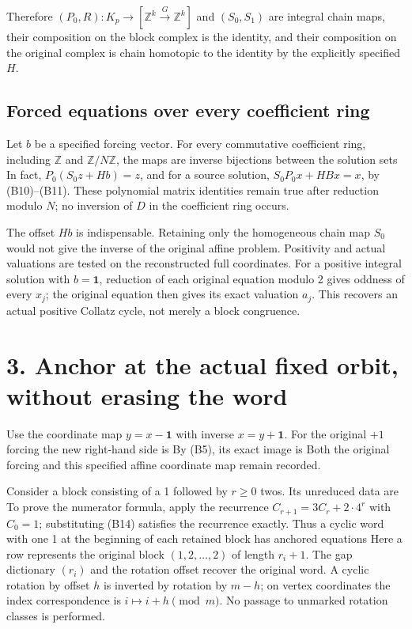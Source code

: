 Therefore \((P_0,R):K_p\to[\mathbb Z^k\xrightarrow G\mathbb Z^k]\) and
\((S_0,S_1)\) are integral chain maps, their composition on the block
complex is the identity, and their composition on the original complex
is chain homotopic to the identity by the explicitly specified \(H\).

\subsection{Forced equations over every coefficient ring}

Let \(b\) be a specified forcing vector. For every commutative
coefficient ring, including \(\mathbb Z\) and \(\mathbb Z/N\mathbb Z\),
the maps  are inverse bijections between the
solution sets  In fact,
 \(P_0(S_0z+Hb)=z\), and
for a source solution, \(S_0P_0x+HBx=x\), by (B10)--(B11). These
polynomial matrix identities remain true after reduction modulo \(N\);
no inversion of \(D\) in the coefficient ring occurs.

The offset \(Hb\) is indispensable. Retaining only the homogeneous chain
map \(S_0\) would not give the inverse of the original affine problem.
Positivity and actual valuations are tested on the reconstructed full
coordinates. For a positive integral solution with \(b=\mathbf1\),
reduction of each original equation modulo 2 gives oddness of every
\(x_j\); the original equation then gives its exact valuation \(a_j\).
This recovers an actual positive Collatz cycle, not merely a block
congruence.

\section{3. Anchor at the actual fixed orbit, without erasing the word}

Use the coordinate map \(y=x-\mathbf1\) with inverse \(x=y+\mathbf1\).
For the original \(+1\) forcing the new right-hand side is
 By (B5), its
exact image is  Both the
original forcing and this specified affine coordinate map remain
recorded.

Consider a block consisting of a 1 followed by \(r\ge0\) twos. Its
unreduced data are
 To prove the numerator formula,
apply the recurrence \(C_{r+1}=3C_r+2\cdot4^r\) with \(C_0=1\);
substituting (B14) satisfies the recurrence exactly. Thus a cyclic word
with one 1 at the beginning of each retained block has anchored
equations
Here a row represents the original block \((1,2,\ldots,2)\) of length
\(r_i+1\). The gap dictionary \((r_i)\) and the rotation offset recover
the original word. A cyclic rotation by offset \(h\) is inverted by
rotation by \(m-h\); on vertex coordinates the index correspondence is
\(i\mapsto i+h\pmod m\). No passage to unmarked rotation classes is
performed.

